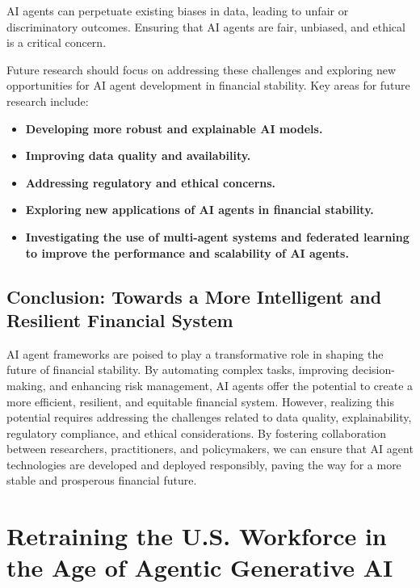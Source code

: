 \documentclass[a4paper,headinclude=on,footinclude=on,12pt,oneside]{scrbook}
\begin{document}
AI agents can perpetuate existing biases in data, leading to unfair or discriminatory outcomes. Ensuring that AI agents are fair, unbiased, and ethical is a critical concern.


Future research should focus on addressing these challenges and exploring new opportunities for AI agent development in financial stability. Key areas for future research include:

\begin{itemize}
\item \textbf{Developing more robust and explainable AI models.}
\item \textbf{Improving data quality and availability.}
\item \textbf{Addressing regulatory and ethical concerns.}
\item \textbf{Exploring new applications of AI agents in financial stability.}
\item \textbf{Investigating the use of multi-agent systems and federated learning to improve the performance and scalability of AI agents.}
\end{itemize}

\section*{Conclusion: Towards a More Intelligent and Resilient Financial System}

AI agent frameworks are poised to play a transformative role in shaping the future of financial stability. By automating complex tasks, improving decision-making, and enhancing risk management, AI agents offer the potential to create a more efficient, resilient, and equitable financial system. However, realizing this potential requires addressing the challenges related to data quality, explainability, regulatory compliance, and ethical considerations. By fostering collaboration between researchers, practitioners, and policymakers, we can ensure that AI agent technologies are developed and deployed responsibly, paving the way for a more stable and prosperous financial future.

\chapter{Retraining the U.S. Workforce in the Age of Agentic Generative AI}

\end{document}
